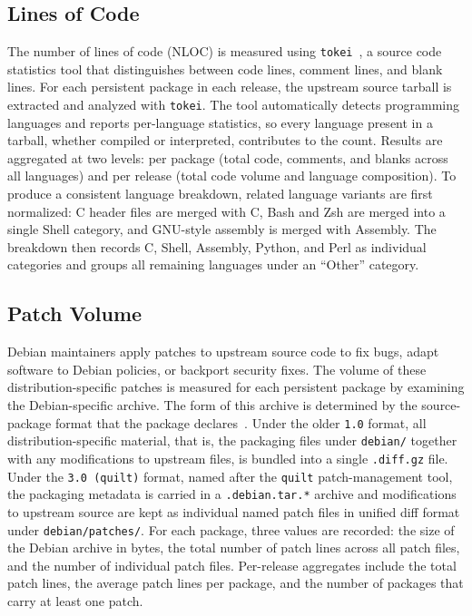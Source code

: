 \subsection{Lines of Code}
\label{sec:metric-nloc}

The number of lines of code (NLOC) is measured using \texttt{tokei}~\cite{tokei}, a source code statistics tool that distinguishes between code lines, comment lines, and blank lines. For each persistent package in each release, the upstream source tarball is extracted and analyzed with \texttt{tokei}. The tool automatically detects programming languages and reports per-language statistics, so every language present in a tarball, whether compiled or interpreted, contributes to the count. Results are aggregated at two levels: per package (total code, comments, and blanks across all languages) and per release (total code volume and language composition). To produce a consistent language breakdown, related language variants are first normalized: C header files are merged with C, Bash and Zsh are merged into a single Shell category, and GNU-style assembly is merged with Assembly. The breakdown then records C, Shell, Assembly, Python, and Perl as individual categories and groups all remaining languages under an ``Other'' category.

\subsection{Patch Volume}
\label{sec:metric-patches}

Debian maintainers apply patches to upstream source code to fix bugs, adapt software to Debian policies, or backport security fixes. The volume of these distribution-specific patches is measured for each persistent package by examining the Debian-specific archive. The form of this archive is determined by the source-package format that the package declares~\cite{debsrc3quilt}. Under the older \texttt{1.0} format, all distribution-specific material, that is, the packaging files under \texttt{debian/} together with any modifications to upstream files, is bundled into a single \texttt{.diff.gz} file. Under the \texttt{3.0 (quilt)} format, named after the \texttt{quilt} patch-management tool, the packaging metadata is carried in a \texttt{.debian.tar.*} archive and modifications to upstream source are kept as individual named patch files in unified diff format under \texttt{debian/patches/}. For each package, three values are recorded: the size of the Debian archive in bytes, the total number of patch lines across all patch files, and the number of individual patch files. Per-release aggregates include the total patch lines, the average patch lines per package, and the number of packages that carry at least one patch.


